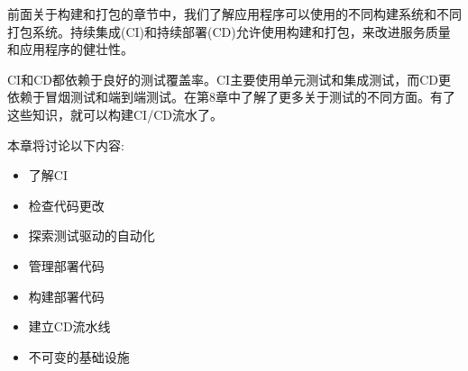 

前面关于构建和打包的章节中，我们了解应用程序可以使用的不同构建系统和不同打包系统。持续集成(CI)和持续部署(CD)允许使用构建和打包，来改进服务质量和应用程序的健壮性。

CI和CD都依赖于良好的测试覆盖率。CI主要使用单元测试和集成测试，而CD更依赖于冒烟测试和端到端测试。在第8章中了解了更多关于测试的不同方面。有了这些知识，就可以构建CI/CD流水了。

本章将讨论以下内容:

\begin{itemize}
\item 
了解CI

\item 
检查代码更改

\item 
探索测试驱动的自动化

\item 
管理部署代码

\item 
构建部署代码

\item 
建立CD流水线

\item 
不可变的基础设施
\end{itemize}